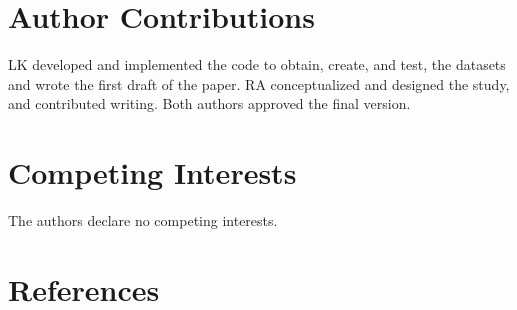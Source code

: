 \documentclass[
  letterpaper,
  DIV=11,
  numbers=noendperiod]{scrartcl}
\begin{document}
\hypertarget{author-contributions}{%
\section{Author Contributions}\label{author-contributions}}

LK developed and implemented the code to obtain, create, and test, the
datasets and wrote the first draft of the paper. RA conceptualized and
designed the study, and contributed writing. Both authors approved the
final version.

\hypertarget{competing-interests}{%
\section{Competing Interests}\label{competing-interests}}

The authors declare no competing interests.

\hypertarget{references}{%
\section*{References}\label{references}}
\end{document}
